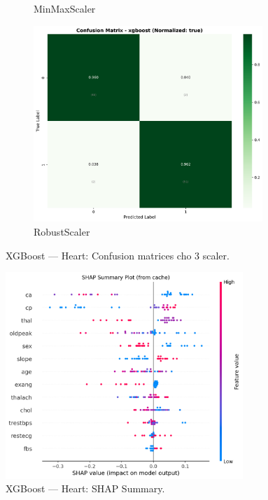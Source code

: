 \begin{figure}[H]
\begin{subfigure}[b]{0.31\textwidth}
\caption{MinMaxScaler}\label{fig:xgb_heart_cm_minmax}
\end{subfigure}\hfill
\begin{subfigure}[b]{0.31\textwidth}\centering
\includegraphics[width=0.95\textwidth]{Result/heart_dataset/confusion_matrices/xgboost_numeric_dataset_RobustScaler.png}
\caption{RobustScaler}\label{fig:xgb_heart_cm_robust}
\end{subfigure}
\caption{XGBoost — Heart: Confusion matrices cho 3 scaler.}
\label{fig:xgb_heart_confusions}
\end{figure}

\begin{figure}[H]
\centering
\includegraphics[width=0.8\textwidth]{Result/heart_dataset/XGBoost/SHAP/Summary.png}
\caption{XGBoost — Heart: SHAP Summary.}
\label{fig:xgb_heart_shap_summary}
\end{figure}

